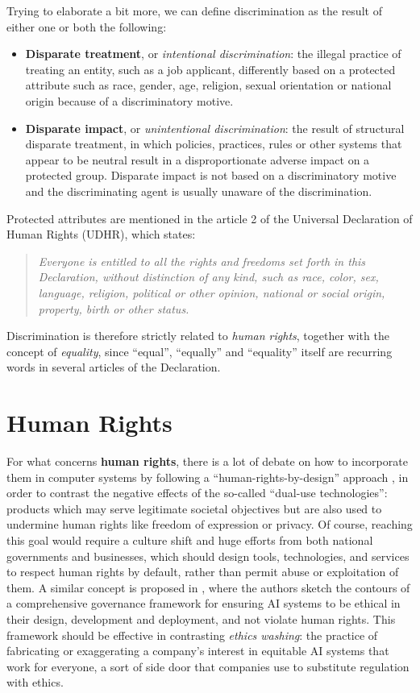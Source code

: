 Trying to elaborate a bit more, we can define discrimination as the result of either one or both the following:
\begin{itemize}
\item \textbf{Disparate treatment}, or \textit{intentional discrimination}: the illegal practice of treating an entity, such as a job applicant, differently based on a protected attribute such as race, gender, age, religion, sexual orientation or national origin because of a discriminatory motive.
\item \textbf{Disparate impact}, or \textit{unintentional discrimination}: the result of structural disparate treatment, in which policies, practices, rules or other systems that appear to be neutral result in a disproportionate adverse impact on a protected group. Disparate impact is not based on a discriminatory motive and the discriminating agent is usually unaware of the discrimination.
\end{itemize}

Protected attributes are mentioned in the article 2 of the Universal Declaration of Human Rights (UDHR), which states:
\begin{quote}\emph{Everyone is entitled to all the rights and freedoms set forth in this Declaration, without distinction of any kind, such as race, color, sex, language, religion, political or other opinion, national or social origin, property, birth or other status.} \cite{assembly1948universal}\end{quote}
Discrimination is therefore strictly related to \textit{human rights}, together with the concept of \textit{equality}, since ``equal'', ``equally'' and ``equality'' itself are recurring words in several articles of the Declaration.


\section{Human Rights}
For what concerns \textbf{human rights}, there is a lot of debate on how to incorporate them in computer systems by following a ``human-rights-by-design'' approach \cite{penney2018advancing}, in order to contrast the negative effects of the so-called ``dual-use technologies'': products which may serve legitimate societal objectives but are also used to undermine human rights like freedom of expression or privacy. Of course, reaching this goal would require a culture shift and huge efforts from both national governments and businesses, which should design tools, technologies, and services to respect human rights by default, rather than permit abuse or exploitation of them.
A similar concept is proposed in \cite{yeung2020ai}, where the authors sketch the contours of a comprehensive governance framework for ensuring AI systems to be ethical in their design, development and deployment, and not violate human rights. This framework should be effective in contrasting \textit{ethics washing}: the practice of fabricating or exaggerating a company's interest in equitable AI systems that work for everyone, a sort of side door that companies use to substitute regulation with ethics.

